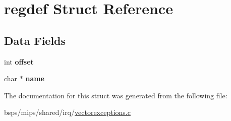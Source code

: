 \hypertarget{structregdef}{}\section{regdef Struct Reference}
\label{structregdef}
\subsection*{Data Fields}
\begin{DoxyCompactItemize}
\item 
\mbox{\label{structregdef_a358a6fb545126859bbdcdaea9fdfee41}} 
int {\bfseries offset}
\item 
\mbox{\label{structregdef_a848c0317372b07485075c2b51dd4bc4f}} 
char $\ast$ {\bfseries name}
\end{DoxyCompactItemize}


The documentation for this struct was generated from the following file\+:\begin{DoxyCompactItemize}
\item 
bsps/mips/shared/irq/\mbox{\hyperlink{vectorexceptions_8c}{vectorexceptions.\+c}}\end{DoxyCompactItemize}
